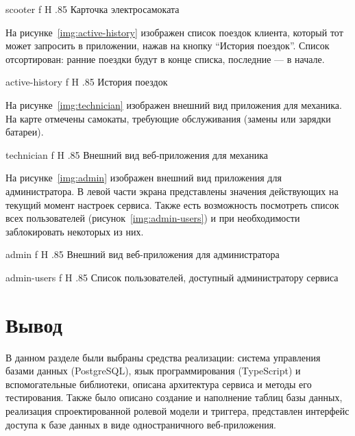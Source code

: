 {scooter}
{f}
{H}
{.85\textwidth}
{Карточка электросамоката}

На рисунке~\ref{img:active-history} изображен список поездок клиента, который тот может запросить в приложении, нажав на кнопку \enquote{История поездок}. Список отсортирован: ранние поездки будут в конце списка, последние --- в начале.

{active-history}
{f}
{H}
{.85\textwidth}
{История поездок}

На рисунке~\ref{img:technician} изображен внешний вид приложения для механика. На карте отмечены самокаты, требующие обслуживания (замены или зарядки батареи).

{technician}
{f}
{H}
{.85\textwidth}
{Внешний вид веб-приложения для механика}

На рисунке~\ref{img:admin} изображен внешний вид приложения для администратора. В левой части экрана представлены значения действующих на текущий момент настроек сервиса. Также есть возможность посмотреть список всех пользователей (рисунок~\ref{img:admin-users}) и при необходимости заблокировать некоторых из них.

{admin}
{f}
{H}
{.85\textwidth}
{Внешний вид веб-приложения для администратора}

{admin-users}
{f}
{H}
{.85\textwidth}
{Список пользователей, доступный администратору сервиса}

\section*{Вывод}

В данном разделе были выбраны средства реализации: система управления базами данных (PostgreSQL), язык программирования (TypeScript) и вспомогательные библиотеки, описана архитектура сервиса и методы его тестирования. Также было описано создание и наполнение таблиц базы данных, реализация спроектированной ролевой модели и триггера, представлен интерфейс доступа к базе данных в виде одностраничного веб-приложения.